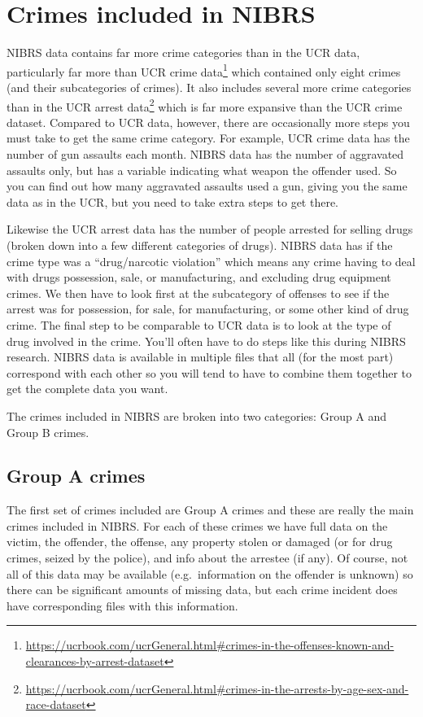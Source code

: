\documentclass[
]{krantz}
\renewcommand{\href}[2]{#2\footnote{\url{#1}}}
\begin{document}
\section{Crimes included in
NIBRS}\label{crimes-included-in-nibrs}

NIBRS data contains far more crime categories than in the
UCR data, particularly far more than
\href{https://ucrbook.com/ucrGeneral.html\#crimes-in-the-offenses-known-and-clearances-by-arrest-dataset}{UCR
crime data} which contained only eight crimes (and their
subcategories of crimes). It also includes several more
crime categories than in the
\href{https://ucrbook.com/ucrGeneral.html\#crimes-in-the-arrests-by-age-sex-and-race-dataset}{UCR
arrest data} which is far more expansive than the UCR crime
dataset. Compared to UCR data, however, there are
occasionally more steps you must take to get the same crime
category. For example, UCR crime data has the number of gun
assaults each month. NIBRS data has the number of aggravated
assaults only, but has a variable indicating what weapon the
offender used. So you can find out how many aggravated
assaults used a gun, giving you the same data as in the UCR,
but you need to take extra steps to get there.

Likewise the UCR arrest data has the number of people
arrested for selling drugs (broken down into a few different
categories of drugs). NIBRS data has if the crime type was a
``drug/narcotic violation'' which means any crime having to
deal with drugs possession, sale, or manufacturing, and
excluding drug equipment crimes. We then have to look first
at the subcategory of offenses to see if the arrest was for
possession, for sale, for manufacturing, or some other kind
of drug crime. The final step to be comparable to UCR data
is to look at the type of drug involved in the crime. You'll
often have to do steps like this during NIBRS research.
NIBRS data is available in multiple files that all (for the
most part) correspond with each other so you will tend to
have to combine them together to get the complete data you
want.

The crimes included in NIBRS are broken into two categories:
Group A and Group B crimes.

\subsection{Group A crimes}\label{group-a-crimes}

The first set of crimes included are Group A crimes and
these are really the main crimes included in NIBRS. For each
of these crimes we have full data on the victim, the
offender, the offense, any property stolen or damaged (or
for drug crimes, seized by the police), and info about the
arrestee (if any). Of course, not all of this data may be
available (e.g.~information on the offender is unknown) so
there can be significant amounts of missing data, but each
crime incident does have corresponding files with this
information.
\end{document}
